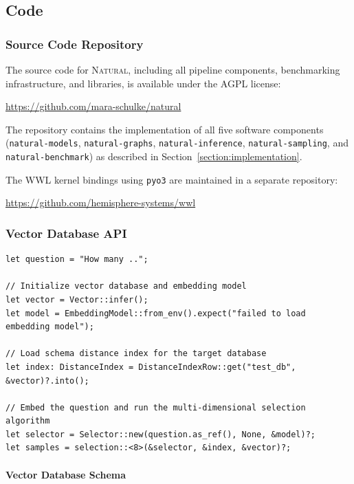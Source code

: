 \subsection{Code}

\subsubsection{Source Code Repository}\label{appendix:source-code}

The source code for \textsc{Natural}, including all pipeline components,
benchmarking infrastructure, and libraries, is available under the AGPL
license:

\begin{center}
\url{https://github.com/mara-schulke/natural}
\end{center}

The repository contains the implementation of all five software components
(\texttt{natural-models}, \texttt{natural-graphs}, \texttt{natural-inference},
\texttt{natural-sampling}, and \texttt{natural-benchmark}) as described in
Section~\ref{section:implementation}.

The WWL kernel bindings using \texttt{pyo3} are maintained in a separate
repository:

\begin{center}
\url{https://github.com/hemisphere-systems/wwl}
\end{center}

\subsubsection{Vector Database API}\label{appendix:vector-db-api}

\begin{verbatim}
let question = "How many ..";

// Initialize vector database and embedding model
let vector = Vector::infer();
let model = EmbeddingModel::from_env().expect("failed to load embedding model");

// Load schema distance index for the target database
let index: DistanceIndex = DistanceIndexRow::get("test_db", &vector)?.into();

// Embed the question and run the multi-dimensional selection algorithm
let selector = Selector::new(question.as_ref(), None, &model)?;
let samples = selection::<8>(&selector, &index, &vector)?;
\end{verbatim}

\paragraph{Vector Database Schema}\label{appendix:vector-schema}

